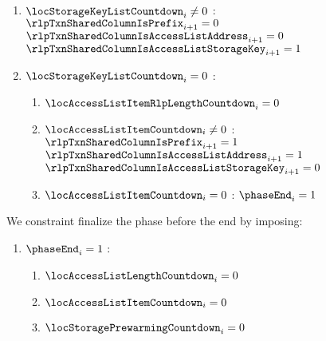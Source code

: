 \begin{enumerate}[resume]
\begin{enumerate}[resume]
\begin{enumerate}
					\item \If $\locStorageKeyListCountdown _{i} \neq 0$ \Then: $\rlpTxnSharedColumnIsPrefix _{i + 1} = 0$ \et $\rlpTxnSharedColumnIsAccessListAddress _{i + 1} = 0$ \et $\rlpTxnSharedColumnIsAccessListStorageKey _{i + 1} = 1$
					\item \If $\locStorageKeyListCountdown _{i} = 0$ \Then:
						\begin{enumerate}
							\item $\locAccessListItemRlpLengthCountdown _{i} = 0$
							\item \If $\locAccessListItemCountdown _{i} \neq 0$ \Then: $\rlpTxnSharedColumnIsPrefix _{i + 1} = 1$ \et $\rlpTxnSharedColumnIsAccessListAddress _{i + 1} = 1$ \et $\rlpTxnSharedColumnIsAccessListStorageKey _{i + 1} = 0$
							\item \If $\locAccessListItemCountdown _{i} = 0$ \Then: $\phaseEnd _{i} =1$
						\end{enumerate}
				\end{enumerate}
		\end{enumerate}

		We constraint finalize the phase before the end by imposing:
		\begin{enumerate}
			\item \If $\phaseEnd _{i} =1$ \Then:
				\begin{enumerate}
					\item $\locAccessListLengthCountdown  _{i} =0$
					\item $\locAccessListItemCountdown _{i} =0$
					\item $\locStoragePrewarmingCountdown _{i} =0$
				\end{enumerate}
		\end{enumerate}


\end{enumerate}
